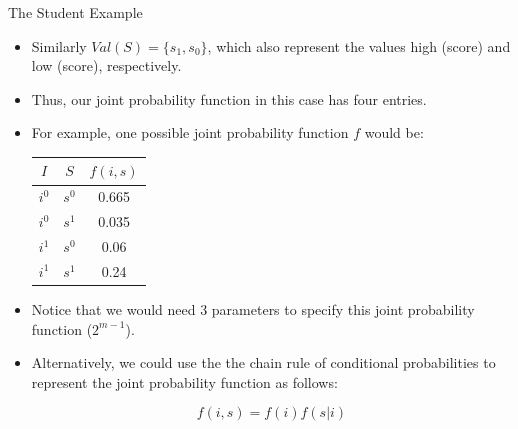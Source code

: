 \documentclass[handout]{beamer}
\begin{document}
\begin{frame}{The Student Example}
\scriptsize{
\begin{itemize}

\item Similarly $Val(S) = \{s_1 , s_0 \}$, which
also represent the values high (score) and low (score), respectively.

\item Thus, our joint probability function in this case has four entries. 
\item For example, one possible joint probability function $f$ would be:

\begin{table}
\centering
  \begin{tabular}{cc|c} \hline
$I$ & $S$ & $f(i,s)$  \\ \hline
$i^0$ & $s^0$ & 0.665 \\
$i^0$ & $s^1$ & 0.035 \\
$i^1$ & $s^0$ & 0.06 \\
$i^1$ & $s^1$ & 0.24 
\end{tabular} 
\end{table}

\item Notice that we would need 3 parameters to specify this joint probability function ($2^{m-1}$).

\item Alternatively, we could use the the chain rule of conditional probabilities to represent the joint probability function as follows:

\begin{displaymath}
 f(i,s) = f(i)f(s|i)
\end{displaymath}

\end{itemize}



} 

\end{frame}
\end{document}
